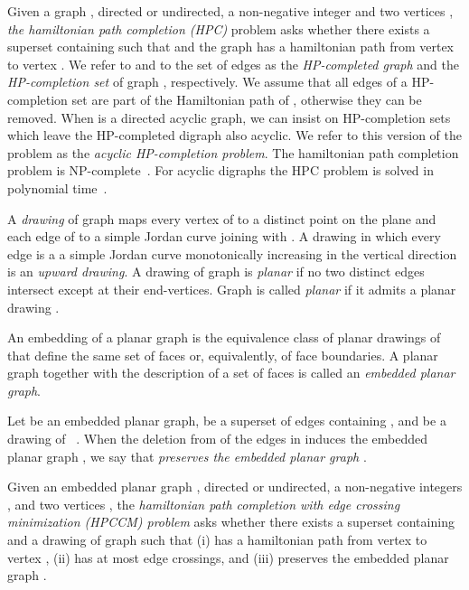\documentclass{myllncs-mixalis}
\begin{document}
Given a graph , directed or undirected, a non-negative
integer  and two vertices , \emph{the
hamiltonian path completion (HPC)} problem asks whether there exists
a superset  containing  such that   and the graph  has a hamiltonian path
from vertex  to vertex . We refer to   and to the
set of edges  as the \emph{HP-completed graph} and
the \emph{HP-completion set} of graph , respectively. We assume
that all edges of a HP-completion set are part of the Hamiltonian
path of , otherwise they can be removed. When  is a
directed acyclic graph, we can insist on HP-completion sets which
leave the HP-completed digraph also acyclic. We refer to this
version of the problem as the \emph{acyclic HP-completion problem}.
The hamiltonian path completion problem is
NP-complete~\cite{GareyJ79}. For
acyclic digraphs the  HPC problem is solved in polynomial time~\cite{KarejanM80}.

A \emph{drawing}   of graph  maps every vertex  of 
to a distinct point  on the plane and each edge  of
 to a simple Jordan curve joining  with . A drawing
in which every edge  is a a simple Jordan curve monotonically
increasing in the vertical direction is an \emph{upward  drawing}. A
drawing  of graph  is \emph{planar} if no two distinct
edges intersect except at their end-vertices. Graph  is  called
\emph{planar} if it admits a planar drawing .

An embedding of a planar graph  is the equivalence class of
planar drawings of  that define the same set of faces or,
equivalently, of face boundaries. A planar graph together with the
description of a set of faces  is called an \emph{embedded planar
graph}.



Let  be an embedded planar graph,  be a superset
of   edges containing , and  be a drawing of~
. When the deletion from 
of the edges in  induces the embedded planar graph ,
we say that  \emph{preserves the embedded planar
graph }.


\begin{definition}
\label{def:HPCCM} Given an embedded planar  graph   ,
directed or undirected, a non-negative integers , and two
vertices , the \emph{hamiltonian path completion with
edge crossing minimization (HPCCM) problem}  asks whether there
exists a superset  containing  and a drawing
 of graph  such that (i)
 has a hamiltonian path from vertex  to vertex ,
(ii)  has at most  edge crossings, and (iii)
 preserves the embedded planar graph .
\end{definition}
\end{document}
